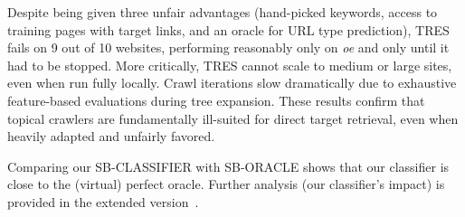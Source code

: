 Despite being given three unfair advantages (hand-picked keywords, access to training pages with target links, and an oracle for URL type prediction), 
\textsf{\small TRES} fails on 9 out of 10 websites, performing reasonably only on \emph{oe} and only until it had to be stopped. More critically, \textsf{\small TRES} cannot scale to medium or large sites, even when run fully locally. Crawl iterations slow dramatically due to exhaustive feature-based evaluations during tree expansion.
These results confirm that topical crawlers are fundamentally ill-suited for direct target retrieval, even when heavily adapted and unfairly favored.

Comparing our \textsf{\small SB-CLASSIFIER} with \textsf{\small SB-ORACLE}
shows that our classifier is close to the (virtual)
	perfect oracle. Further analysis (our classifier's impact) is
  provided in the extended version~\cite{github_repository}.
